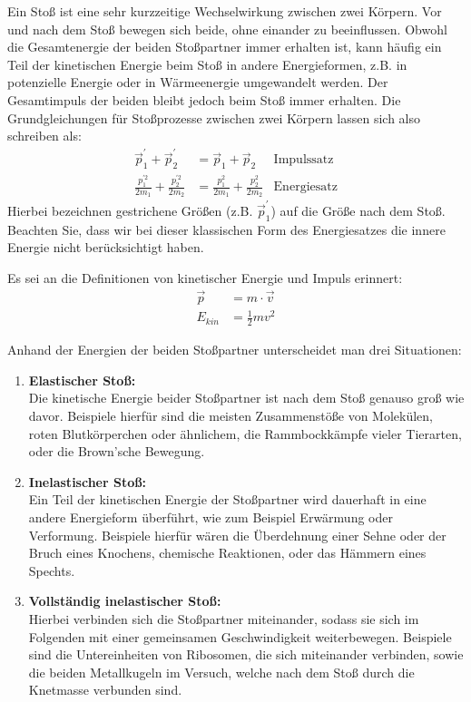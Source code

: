 Ein Stoß ist eine sehr kurzzeitige Wechselwirkung zwischen zwei Körpern. Vor und nach dem Stoß bewegen sich beide, ohne einander zu beeinflussen. Obwohl die Gesamtenergie der beiden Stoßpartner immer erhalten ist, kann häufig ein Teil der kinetischen Energie beim Stoß in andere Energieformen, z.B. in potenzielle Energie oder in Wärmeenergie umgewandelt werden. Der Gesamtimpuls der beiden bleibt jedoch beim Stoß immer erhalten. Die Grundgleichungen für Stoßprozesse zwischen zwei Körpern lassen sich also schreiben als:
\begin{align}
\vec{p}_1^{'} + \vec{p}_2^{'} &= \vec{p}_1 + \vec{p}_2 &\mathrm{Impulssatz}\\
\frac{p_1^{'2}}{2m_1} + \frac{p_2^{'2}}{2m_2} &= \frac{p_1^{2}}{2m_1} + \frac{p_2^{2}}{2m_2} &\mathrm{Energiesatz}
\end{align} 
%
Hierbei bezeichnen gestrichene Größen (z.B. $\vec{p}_1^{'}$) auf die Größe nach dem Stoß. Beachten Sie, dass wir bei dieser klassischen Form des Energiesatzes die innere Energie nicht berücksichtigt haben.\\
%
\begin{hint}
	Es sei an die Definitionen von kinetischer Energie und Impuls erinnert:
	\begin{align}
		\vec{p} &= m\cdot\vec{v}\\
		E_{kin} &= \frac{1}{2}mv^2 
	\end{align}
\end{hint}
%
Anhand der Energien der beiden Stoßpartner unterscheidet man drei Situationen:
\begin{enumerate}
	\item \textbf{Elastischer Stoß:}\\
		Die kinetische Energie beider Stoßpartner ist nach dem Stoß genauso groß wie davor. Beispiele hierfür sind die meisten Zusammenstöße von Molekülen, roten Blutkörperchen oder ähnlichem, die Rammbockkämpfe vieler Tierarten, oder die Brown'sche Bewegung.
	\item \textbf{Inelastischer Stoß:}\\
		Ein Teil der kinetischen Energie der Stoßpartner wird dauerhaft in eine andere Energieform überführt, wie zum Beispiel Erwärmung oder Verformung. Beispiele hierfür wären die Überdehnung einer Sehne oder der Bruch eines Knochens, chemische Reaktionen, oder das Hämmern eines Spechts.
	\item \textbf{Vollständig inelastischer Stoß:}\\
		Hierbei verbinden sich die Stoßpartner miteinander, sodass sie sich im Folgenden mit einer gemeinsamen Geschwindigkeit weiterbewegen. Beispiele sind die Untereinheiten von Ribosomen, die sich miteinander verbinden, sowie die beiden Metallkugeln im Versuch, welche nach dem Stoß durch die Knetmasse verbunden sind.
\end{enumerate}

